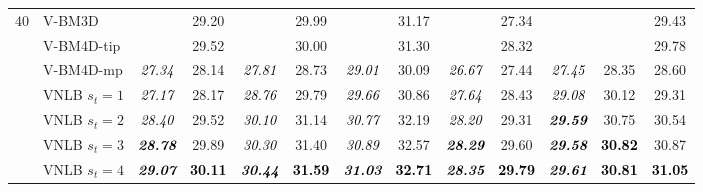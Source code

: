 \documentclass[10pt, journal, twocolumn, final, a4paper]{IEEEtran}
\newcommand{\best}[1]{#1}
\newcommand{\bsic}[1]{\textcolor{black}{\textit{#1}}}
\newcommand{\Bsic}[1]{\textcolor{black}{\textbf{\textit{#1}}}}
\newcommand{\Best}[1]{\textbf{\textcolor{black}{#1}}}
\begin{document}
\begin{table}[htp!]
\begin{center}
{\begin{tabular}{ c | l |c c | c c | c c | c c | c c | c}
%
			\multirow{1}{*}{$40$}
			                      & V-BM3D               & \bsic{     } &       29.20  & \bsic{     } & \best{29.99} & \bsic{     } &       31.17  & \bsic{     } &       27.34  & \bsic{     } &              &       29.43  \\
			                      & V-BM4D-tip           & \bsic{     } & \best{29.52} & \bsic{     } & \best{30.00} & \bsic{     } & \best{31.30} & \bsic{     } &       28.32  & \bsic{     } &              &       29.78  \\
			                      & V-BM4D-mp            & \bsic{27.34} &       28.14  & \bsic{27.81} &       28.73  & \bsic{29.01} &       30.09  & \bsic{26.67} &       27.44  & \bsic{27.45} &       28.35  &       28.60  \\
			                      & VNLB   $s_t = 1$     & \bsic{27.17} &       28.17  & \bsic{28.76} &       29.79  & \bsic{29.66} &       30.86  & \bsic{27.64} &       28.43  & \bsic{29.08} &       30.12  &       29.31  \\
			                      & VNLB   $s_t = 2$     & \bsic{28.40} &       29.52  & \bsic{30.10} &       31.14  & \bsic{30.77} &       32.19  & \bsic{28.20} &       29.31  & \Bsic{29.59} &       30.75  &       30.54  \\
			                      & VNLB   $s_t = 3$     & \Bsic{28.78} &       29.89  & \bsic{30.30} &       31.40  & \bsic{30.89} &       32.57  & \Bsic{28.29} &       29.60  & \Bsic{29.58} & \Best{30.82} &       30.87  \\
			                      & VNLB   $s_t = 4$     & \Bsic{29.07} & \Best{30.11} & \Bsic{30.44} & \Best{31.59} & \Bsic{31.03} & \Best{32.71} & \Bsic{28.35} & \Best{29.79} & \Bsic{29.61} & \Best{30.81} & \Best{31.05} \\\hline

\end{tabular}}
\end{center}
\end{table}
\end{document}
